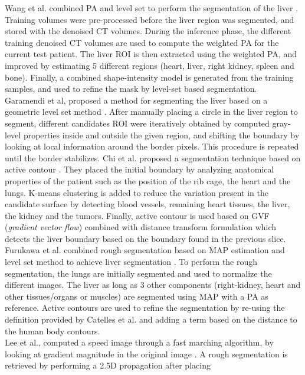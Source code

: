 \documentclass[]{article}
\begin{document}
	
	Wang et al. combined PA and level set to perform the segmentation of the liver \cite{Wang2016}. Training volumes were pre-processed before the liver region was
	segmented, and stored with the denoised CT volumes. During the inference
	phase, the different training denoised CT volumes are used to compute
	the weighted PA for the current test patient. The liver ROI is then
	extracted using the weighted PA, and improved by estimating 5 different
	regions (heart, liver, right kidney, spleen and bone). Finally, a
	combined shape-intensity model is generated from the training samples,
	and used to refine the mask by level-set based segmentation.\\
	Garamendi et al, proposed a method for segmenting the liver based on a
	geometric level set method \cite{Garamendi2007}. After manually placing a circle in the liver
	region to segment, different candidates ROI were iteratively obtained by
	computed gray-level properties inside and outside the given region, and
	shifting the boundary by looking at local information around the border
	pixels. This procedure is repeated until the border stabilizes.
	Chi et al. proposed a segmentation technique based on active
	contour \cite{Chi2007}. They placed the initial boundary by analyzing anatomical
	properties of the patient such as the position of the rib cage, the
	heart and the lungs. K-means clustering is added to reduce the variation
	present in the candidate surface by detecting blood vessels, remaining
	heart tissues, the liver, the kidney and the tumors. Finally, active
	contour is used based on GVF (\emph{gradient vector flow}) combined with
	distance transform formulation which detects the liver boundary based on
	the boundary found in the previous slice.
	Furukawa et al. combined rough segmentation based on MAP estimation and
	level set method to achieve liver segmentation \cite{Furukawa2007}. To perform the rough
	segmentation, the lungs are initially segmented and used to normalize
	the different images. The liver as long as 3 other components
	(right-kidney, heart and other tissues/organs or muscles) are segmented
	using MAP with a PA as reference. Active contours are used to refine the
	segmentation by re-using the definition provided by Catelles et al. and
	adding a term based on the distance to the human body contours.\\ 
	Lee et al., computed a speed image through a fast marching algorithm, by
	looking at gradient magnitude in the original image \cite{Lee2007}. A rough
	segmentation is retrieved by performing a 2.5D propagation after placing
\end{document}
